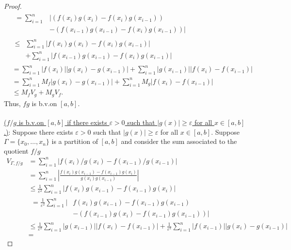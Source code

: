 \begin{proof}
\begin{equation}
\begin{aligned}
      &\begin{aligned}
        =\sum_{i=1}^n
        &\left|(f(x_i)g(x_i)-f(x_i)g(x_{i-1}))\right.\\
        &\left.-(f(x_{i-1})g(x_{i-1})-f(x_i)g(x_{i-1}))\right|
      \end{aligned}\\
      &\begin{aligned}
        \leq&\sum_{i=1}^n|f(x_i)g(x_i)-f(x_i)g(x_{i-1})|\\
        &+\sum_{i=1}^n|f(x_{i-1})g(x_{i-1})-f(x_i)g(x_{i-1})|
      \end{aligned}\\
      &=\sum_{i=1}^n|f(x_i)||g(x_i)-g(x_{i-1})|+\sum_{i=1}^n|g(x_{i-1})||f(x_i)-f(x_{i-1})|\\
      &=\sum_{i=1}^n
      M_f|g(x_i)-g(x_{i-1})|+\sum_{i=1}^nM_g|f(x_i)-f(x_{i-1})|\\
      &\leq M_fV_g+M_gV_f.
      \end{aligned}
    \end{equation}
    Thus, $fg$ is b.v.\@ on $[a,b]$.
    \\\\
    \underline{($f/g$ is b.v.\@ on $[a,b]$ if there exists $\varepsilon>0$
      such that $|g(x)|\geq\varepsilon$ for all $x\in[a,b]$.)}: Suppose
    there exists $\varepsilon>0$ such that $|g(x)|\geq\varepsilon$ for all
    $x\in[a,b]$. Suppose $\Gamma=\{x_0,\dotsc,x_n\}$ is a partition of
    $[a,b]$ and consider the sum associated to the quotient $f/g$
    \begin{equation}
      \label{eq:1:7}
      \begin{aligned}
        V_{\Gamma,f/g}
        &=\sum_{i=1}^n |f(x_i)/g(x_i)-f(x_{i-1})/g(x_{i-1})|\\
        &=\sum_{i=1}^n\left|\frac{f(x_i)g(x_{i-1})-
            f(x_{i-1})g(x_i)}{g(x_i)g(x_{i-1})}\right|\\
        &\leq\frac{1}{\varepsilon^2}\sum_{i=1}^n|f(x_i)g(x_{i-1})-f(x_{i-1})g(x_i)|\\
        &
        \begin{aligned}
          =\frac{1}{\varepsilon^2}\sum_{i=1}^n |&f(x_i)g(x_{i-1})-f(x_{i-1})g(x_{i-1})\\
          &-(f(x_{i-1})g(x_i)-f(x_{i-1})g(x_{i-1}))|
        \end{aligned}\\
        &\leq
        \frac{1}{\varepsilon^2}\sum_{i=1}^n|g(x_{i-1})||f(x_i)-f(x_{i-1})|
        +\frac{1}{\varepsilon^2}\sum_{i=1}^n|f(x_{i-1})||g(x_i)-g(x_{i-1})|\\
        &=
      \end{aligned}
    \end{equation}
\end{proof}

